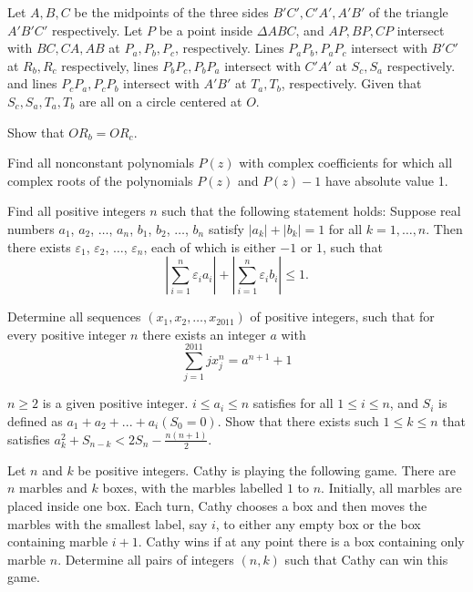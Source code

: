 \documentclass[11pt]{scrartcl}
\begin{document}
\begin{problem}[5261846980754565299]
	Let $A,B,C$ be the midpoints of the three sides $B'C', C'A', A'B'$ of the triangle $A'B'C'$ respectively. Let $P$ be a point inside $\Delta ABC$, and $AP,BP,CP$ intersect with $BC, CA, AB$ at $P_a,P_b,P_c$, respectively. Lines $P_aP_b, P_aP_c$ intersect with $B'C'$ at $R_b, R_c$ respectively, lines $P_bP_c, P_bP_a$ intersect with $C'A'$ at $S_c, S_a$ respectively. and lines $P_cP_a, P_cP_b$ intersect with $A'B'$ at $T_a, T_b$, respectively. Given that $S_c,S_a, T_a, T_b$ are all on a circle centered at $O$.

Show that $OR_b=OR_c$.
\end{problem}
\begin{problem}[16134758174084]
Find all nonconstant polynomials $P(z)$ with complex coefficients for which all complex roots of the polynomials $P(z)$ and $P(z) - 1$ have absolute value 1.

\end{problem}
\begin{problem}[741862231001118]
Find all positive integers $n$ such that the following statement holds: Suppose real numbers $a_1$, $a_2$, $\dots$, $a_n$, $b_1$, $b_2$, $\dots$, $b_n$ satisfy $|a_k|+|b_k|=1$ for all $k=1,\dots,n$. Then there exists $\varepsilon_1$, $\varepsilon_2$, $\dots$, $\varepsilon_n$, each of which is either $-1$ or $1$, such that
\[ \left| \sum_{i=1}^n \varepsilon_i a_i \right| + \left| \sum_{i=1}^n \varepsilon_i b_i \right| \le 1. \]
\end{problem}
\begin{problem}[848370325196914]
Determine all sequences $(x_1,x_2,\ldots,x_{2011})$ of positive integers, such that for every positive integer $n$ there exists an integer $a$ with\[\sum^{2011}_{j=1} j  x^n_j = a^{n+1} + 1\]
\end{problem}
\begin{problem}[655207782865052]
$n\ge2$ is a given positive integer. $i\leq a_i \leq n$ satisfies for all $1\leq i\leq n$, and $S_i$ is defined as $a_1+a_2+...+a_i(S_0=0)$. Show that there exists such $1\leq k\leq n$ that satisfies $a_k^2+S_{n-k}<2S_n-\frac{n(n+1)}{2}$.
\end{problem}
\begin{problem}[7208752288636072458]
Let $n$ and $k$ be positive integers. Cathy is playing the following game. There are $n$ marbles and $k$ boxes, with the marbles labelled $1$ to $n$. Initially, all marbles are placed inside one box. Each turn, Cathy chooses a box and then moves the marbles with the smallest label, say $i$, to either any empty box or the box containing marble $i+1$. Cathy wins if at any point there is a box containing only marble $n$.
Determine all pairs of integers $(n,k)$ such that Cathy can win this game.
\end{problem}
\end{document}
